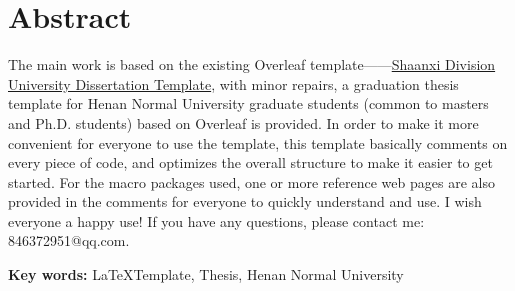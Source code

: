\chapter[Abstract]{Abstract}
\begin{spacing}{1.5}
The main work is based on the existing Overleaf template——\href{https://cn.overleaf.com/latex/templates/shan-shi-da-xue-wei-lun-wen-mo-ban/cszgkzrnfkkr}{Shaanxi Division University Dissertation Template}, with minor repairs, a graduation thesis template for Henan Normal University graduate students (common to masters and Ph.D. students) based on Overleaf is provided.
In order to make it more convenient for everyone to use the template, this template basically comments on every piece of code, and optimizes the overall structure to make it easier to get started.
For the macro packages used, one or more reference web pages are also provided in the comments for everyone to quickly understand and use. I wish everyone a happy use! If you have any questions, please contact me: 846372951@qq.com.
\end{spacing}

\textbf{Key words: }\LaTeX Template, Thesis, Henan Normal University

\clearpage									%
